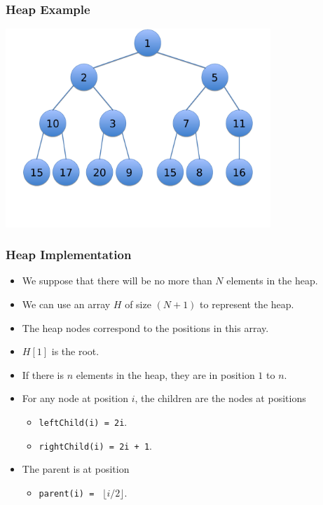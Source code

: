 \documentclass{beamer}
\begin{document}
\begin{frame}[containsverbatim]
\frametitle{Heap Example}

\begin{center}
\includegraphics[width=10cm]{heap.pdf}
\end{center}

\end{frame}

\begin{frame}%
\frametitle{Heap Implementation}

\begin{itemize}
\item We suppose that there will be no more than $N$ elements in the heap.
\vspace{0.1cm}
\item<2-> We can use an array $H$ of size $(N+1)$ to represent the heap.
\vspace{0.1cm}
\item<3-> The heap nodes correspond to the positions in this array.
\vspace{0.1cm}
\item<4-> $H[1]$ is the root.
\vspace{0.1cm}
\item<5-> If there is $n$ elements in the heap, they are in position $1$ to $n$.
\vspace{0.1cm}
\item<6-> For any node at position $i$, the children are the nodes at positions
\begin{itemize}
\item \texttt{leftChild(i) = 2i}.
\item \texttt{rightChild(i) = 2i + 1}.
\end{itemize}
\vspace{0.1cm}
\item<7-> The parent is at position
\begin{itemize}
\item \texttt{parent(i) = } $\lfloor i/2 \rfloor$.
\end{itemize}

\end{itemize}

\end{frame}
\end{document}
